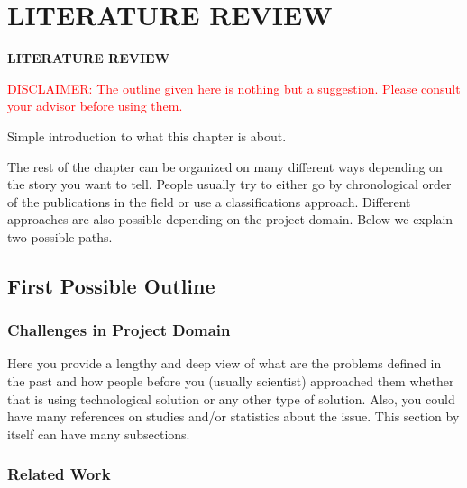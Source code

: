 \chapter{LITERATURE REVIEW}
\pagebreak

\begin{center}
{\LARGE\textbf{LITERATURE REVIEW}}
\end{center}

\textcolor{red}{DISCLAIMER: The outline given here is nothing but a suggestion. Please consult your advisor before using them.}

Simple introduction to what this chapter is about.

The rest of the chapter can be organized on many different ways depending on the story you want to tell. People usually try to either go by chronological order of the publications in the field or use a classifications approach. Different approaches are also possible depending on the project domain. Below we explain two possible paths.

\section{First Possible Outline}
\label{sec:first_possible_outline}

\subsection{Challenges in Project Domain} %
\label{sub:challenges_in_project_domain}

Here you provide a lengthy and deep view of what are the problems defined in the past and how people before you (usually scientist) approached them whether that is using technological solution or any other type of solution. Also, you could have many references on studies and/or statistics about the issue. This section by itself can have many subsections.

\subsection{Related Work}
\label{sub:related_work1}

